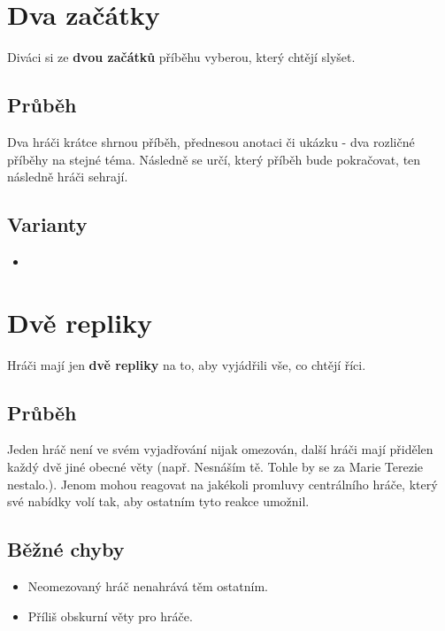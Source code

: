 \documentclass[main.tex]{subfiles}
\begin{document}
\needspace{5cm} \section{Dva začátky} \label{dva začátky}  
 
 
Diváci si ze \textbf{dvou začátků}{} příběhu vyberou, který chtějí slyšet. 
 
 
\subsection{Průběh} Dva hráči krátce shrnou příběh, přednesou anotaci či ukázku - dva rozličné příběhy na stejné téma. 
Následně se  určí, který příběh bude pokračovat, ten následně hráči sehrají. 
 
\subsection{ Varianty } \begin{itemize}
\item  {}
\end{itemize}
 
 
 
\needspace{5cm} \section{Dvě repliky} \label{dvě repliky}  
 
Hráči mají jen \textbf{dvě repliky}{} na to, aby vyjádřili vše, co chtějí říci. 
 
\subsection{Průběh} Jeden hráč není ve svém vyjadřování nijak omezován, další hráči mají přidělen každý dvě jiné obecné věty (např. Nesnáším tě.  Tohle by se za Marie Terezie nestalo.). Jenom  mohou reagovat na jakékoli promluvy centrálního hráče, který své nabídky volí tak, aby ostatním tyto reakce umožnil. 
 
\subsection{Běžné chyby} \begin{itemize}
\item  Neomezovaný hráč nenahrává těm ostatním.
\item  Příliš obskurní věty pro hráče.
\end{itemize}
 
\end{document}
